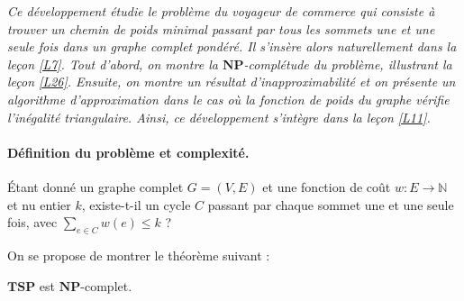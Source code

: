 
\textit{
Ce développement étudie le problème du voyageur de commerce qui consiste à trouver un chemin de poids minimal passant par tous les sommets une et une seule fois dans un graphe complet pondéré. Il s'insère alors naturellement dans la leçon \ref{L7}.
Tout d'abord, on montre la $\mathbf{NP}$-complétude du problème, illustrant la leçon \ref{L26}. Ensuite, on montre un résultat d'inapproximabilité et on présente un algorithme d'approximation dans le cas où la fonction de poids du graphe vérifie l'inégalité triangulaire. Ainsi, ce développement s'intègre dans la leçon \ref{L11}.
}
\paragraph{Définition du problème et complexité.}

\begin{definition}
Étant donné un graphe complet $G=(V,E)$ et une fonction de coût $w : E \rightarrow \mathbb{N}$ et nu entier $k$, existe-t-il un cycle $C$ passant par chaque sommet une et une seule fois, avec $\sum_{e\in C} w(e) \leq k$ ?
\end{definition}


On se propose de montrer le théorème suivant :

\begin{theorem}
$\mathbf{TSP}$ est $\mathbf{NP}$-complet.
\end{theorem}

